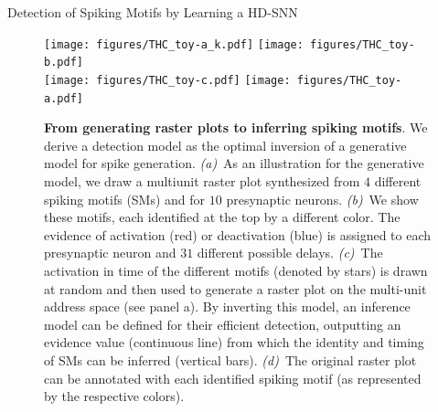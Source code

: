 \documentclass[final]{beamer}
\newlength{\colwidth}
\begin{document}
\begin{frame}[t]
\begin{columns}[t]
\begin{column}{\colwidth}
  \begin{block}{Detection of Spiking Motifs by Learning a HD-SNN~\parencite{Perrinet23ICANN}}

%
%
%
%
%
%
%
\begin{figure}%
  \texttt{[image: figures/THC\_toy-a\_k.pdf]}
  \texttt{[image: figures/THC\_toy-b.pdf]}
  \\
  \texttt{[image: figures/THC\_toy-c.pdf]}
  \texttt{[image: figures/THC\_toy-a.pdf]} 
\caption{ \justifying \textbf{From generating raster plots to inferring spiking motifs}. We derive a detection model as the optimal inversion of a generative model for spike generation.  \textit{(a)}~As an illustration for the generative model, we draw a multiunit raster plot synthesized from $4$ different spiking motifs (SMs) and for $10$ presynaptic neurons. \textit{(b)}~We show these motifs, each identified at the top by a different color. The evidence of activation (red) or deactivation (blue) is assigned to each presynaptic neuron and $31$ different possible delays. \textit{(c)}~The activation in time of the different motifs (denoted by stars) is drawn at random and then used to generate a raster plot on the multi-unit address space (see panel a). By inverting this model, an inference model can be defined for their efficient detection, outputting an evidence value (continuous line) from which the identity and timing of SMs can be inferred (vertical bars). \textit{(d)}~The original raster plot can be annotated with each identified spiking motif (as represented by the respective   colors).
}
\label{fig:THC}
\end{figure}
  \end{block}


\end{column}
\end{columns}
\end{frame}
\end{document}

